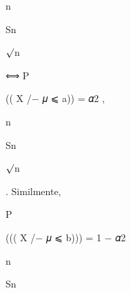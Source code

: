 \documentclass[a4paper,portrait,12pt]{article}
\begin{document}
\begin{flushleft}
n
\end{flushleft}


\begin{flushleft}
Sn
\end{flushleft}





\begin{flushleft}
$\surd$n
\end{flushleft}





\begin{flushleft}
⟺ P
\end{flushleft}





\begin{flushleft}
(( X /$-$ 𝜇 ⩽ a)) = 𝛼2 ,
\end{flushleft}


\begin{flushleft}
n
\end{flushleft}


\begin{flushleft}
Sn
\end{flushleft}





\begin{flushleft}
$\surd$n
\end{flushleft}





\begin{flushleft}
. Similmente,
\end{flushleft}


\begin{flushleft}
P
\end{flushleft}





\begin{flushleft}
((( X /$-$ 𝜇 ⩽ b))) = 1 $-$ 𝛼2
\end{flushleft}


\begin{flushleft}
n
\end{flushleft}


\begin{flushleft}
Sn
\end{flushleft}
\end{document}
